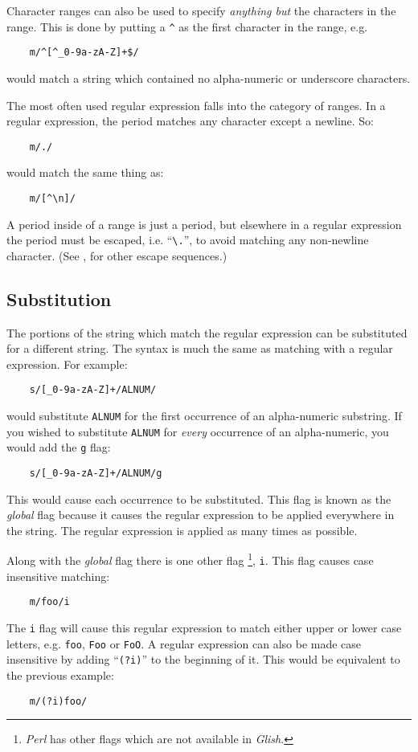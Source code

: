 Character ranges can also be used to specify {\em anything but} the characters
in the range. This is done by putting a \verb+^+ as the first character in the
range, e.g. 
\begin{verbatim}
    m/^[^_0-9a-zA-Z]+$/
\end{verbatim}
would match a string which contained no alpha-numeric or underscore characters.

The most often used regular expression falls into the category of ranges. In
a regular expression, the period matches any character except a newline. So:
\begin{verbatim}
    m/./
\end{verbatim}
would match the same thing as:
\begin{verbatim}
    m/[^\n]/
\end{verbatim}
A period inside of a range is just a period, but elsewhere
in a regular expression the period must be escaped, i.e. ``\verb+\.+'', to
avoid matching any non-newline character. (See , for other
escape sequences.)

\subsection{Substitution}
The portions of the string which match the regular expression can be
substituted for a different string. The syntax is much the same as matching
with a regular expression. For example:
\begin{verbatim}
    s/[_0-9a-zA-Z]+/ALNUM/
\end{verbatim}
would substitute {\tt ALNUM} for the first occurrence of an alpha-numeric
substring. 
If you wished to substitute {\tt ALNUM} for {\em every} occurrence of an
alpha-numeric, you would add the {\tt g} flag:
\begin{verbatim}
    s/[_0-9a-zA-Z]+/ALNUM/g
\end{verbatim}
\label{regex-global}
This would cause each occurrence to be substituted. This flag is known
as the {\em global} flag because it causes the regular expression to
be applied everywhere in the string. The regular expression is applied
as many times as possible.

Along with the {\em global} flag there is one other flag
\footnote{{\em Perl} has other flags which are not available in {\em Glish}.},
{\tt i}. This flag causes case insensitive matching:
\begin{verbatim}
    m/foo/i
\end{verbatim}
The {\tt i} flag will cause this regular expression to match either
upper or lower case letters, e.g. {\tt foo}, {\tt Foo} or {\tt FoO}.
A regular expression can also be made case insensitive by adding
``\verb+(?i)+'' to the beginning of it. This would be equivalent
to the previous example:
\begin{verbatim}
    m/(?i)foo/
\end{verbatim}

